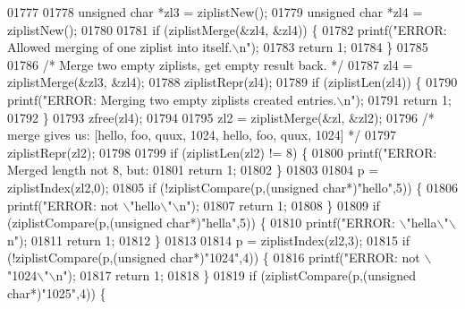 \begin{DoxyCode}
{{{{{{{{{{{{{{{{{{{{{{{{{{{{{01777 
01778         \textcolor{keywordtype}{unsigned} \textcolor{keywordtype}{char} *zl3 = ziplistNew();
01779         \textcolor{keywordtype}{unsigned} \textcolor{keywordtype}{char} *zl4 = ziplistNew();
01780 
01781         \textcolor{keywordflow}{if} (ziplistMerge(&zl4, &zl4)) \{
01782             printf(\textcolor{stringliteral}{"ERROR: Allowed merging of one ziplist into itself.\(\backslash\)n"});
01783             \textcolor{keywordflow}{return} 1;
01784         \}
01785 
01786         \textcolor{comment}{/* Merge two empty ziplists, get empty result back. */}
01787         zl4 = ziplistMerge(&zl3, &zl4);
01788         ziplistRepr(zl4);
01789         \textcolor{keywordflow}{if} (ziplistLen(zl4)) \{
01790             printf(\textcolor{stringliteral}{"ERROR: Merging two empty ziplists created entries.\(\backslash\)n"});
01791             \textcolor{keywordflow}{return} 1;
01792         \}
01793         zfree(zl4);
01794 
01795         zl2 = ziplistMerge(&zl, &zl2);
01796         \textcolor{comment}{/* merge gives us: [hello, foo, quux, 1024, hello, foo, quux, 1024] */}
01797         ziplistRepr(zl2);
01798 
01799         \textcolor{keywordflow}{if} (ziplistLen(zl2) != 8) \{
01800             printf(\textcolor{stringliteral}{"ERROR: Merged length not 8, but: %
01801             \textcolor{keywordflow}{return} 1;
01802         \}
01803 
01804         p = ziplistIndex(zl2,0);
01805         \textcolor{keywordflow}{if} (!ziplistCompare(p,(\textcolor{keywordtype}{unsigned} \textcolor{keywordtype}{char}*)\textcolor{stringliteral}{"hello"},5)) \{
01806             printf(\textcolor{stringliteral}{"ERROR: not \(\backslash\)"hello\(\backslash\)"\(\backslash\)n"});
01807             \textcolor{keywordflow}{return} 1;
01808         \}
01809         \textcolor{keywordflow}{if} (ziplistCompare(p,(\textcolor{keywordtype}{unsigned} \textcolor{keywordtype}{char}*)\textcolor{stringliteral}{"hella"},5)) \{
01810             printf(\textcolor{stringliteral}{"ERROR: \(\backslash\)"hella\(\backslash\)"\(\backslash\)n"});
01811             \textcolor{keywordflow}{return} 1;
01812         \}
01813 
01814         p = ziplistIndex(zl2,3);
01815         \textcolor{keywordflow}{if} (!ziplistCompare(p,(\textcolor{keywordtype}{unsigned} \textcolor{keywordtype}{char}*)\textcolor{stringliteral}{"1024"},4)) \{
01816             printf(\textcolor{stringliteral}{"ERROR: not \(\backslash\)"1024\(\backslash\)"\(\backslash\)n"});
01817             \textcolor{keywordflow}{return} 1;
01818         \}
01819         \textcolor{keywordflow}{if} (ziplistCompare(p,(\textcolor{keywordtype}{unsigned} \textcolor{keywordtype}{char}*)\textcolor{stringliteral}{"1025"},4)) \{
}}}}}}}}}}}}}}}}}}}}}}}}}}}}}}
\end{DoxyCode}
